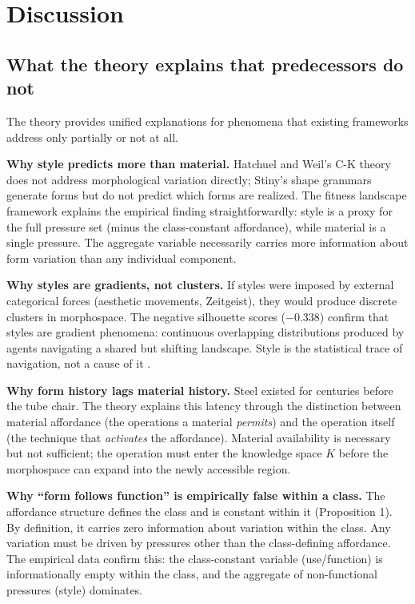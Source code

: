 \section{Discussion}
\label{sec:discussion}

\subsection{What the theory explains that predecessors do not}

The theory provides unified explanations for phenomena that existing frameworks address only partially or not at all.

\textbf{Why style predicts more than material.} Hatchuel and Weil's C-K theory does not address morphological variation directly; Stiny's shape grammars generate forms but do not predict which forms are realized. The fitness landscape framework explains the empirical finding straightforwardly: style is a proxy for the full pressure set (minus the class-constant affordance), while material is a single pressure. The aggregate variable necessarily carries more information about form variation than any individual component.

\textbf{Why styles are gradients, not clusters.} If styles were imposed by external categorical forces (aesthetic movements, Zeitgeist), they would produce discrete clusters in morphospace. The negative silhouette scores ($-0.338$) confirm that styles are gradient phenomena: continuous overlapping distributions produced by agents navigating a shared but shifting landscape. Style is the statistical trace of navigation, not a cause of it \parencite{Kubler1962}.

\textbf{Why form history lags material history.} Steel existed for centuries before the tube chair. The theory explains this latency through the distinction between material affordance (the operations a material \textit{permits}) and the operation itself (the technique that \textit{activates} the affordance). Material availability is necessary but not sufficient; the operation must enter the knowledge space $K$ before the morphospace can expand into the newly accessible region.

\textbf{Why ``form follows function'' is empirically false within a class.} The affordance structure defines the class and is constant within it (Proposition 1). By definition, it carries zero information about variation within the class. Any variation must be driven by pressures other than the class-defining affordance. The empirical data confirm this: the class-constant variable (use/function) is informationally empty within the class, and the aggregate of non-functional pressures (style) dominates.

